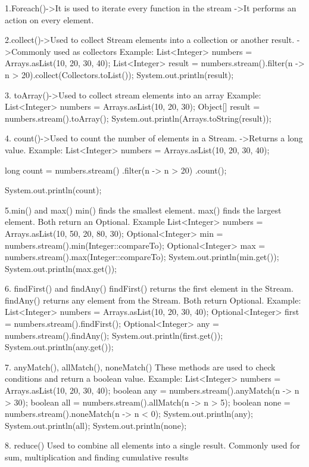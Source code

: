 {{{{{{{{1.Foreach()->It is used to iterate every function in the stream
			->It performs an action on every element.
			
			
2.collect()->Used to collect Stream elements into a collection or another result.
			->Commonly used as collectors
	Example:
			List<Integer> numbers = Arrays.asList(10, 20, 30, 40);
			List<Integer> result = numbers.stream().filter(n -> n > 20).collect(Collectors.toList());
			System.out.println(result);
			
3. toArray()->Used to collect stream elements into an array
Example:
List<Integer> numbers = Arrays.asList(10, 20, 30);
Object[] result = numbers.stream().toArray();
System.out.println(Arrays.toString(result));


4. count()->Used to count the number of elements in a Stream.
		  ->Returns a long value.
	Example:
	List<Integer> numbers = Arrays.asList(10, 20, 30, 40);


long count = numbers.stream()
                    .filter(n -> n > 20)
                    .count();


System.out.println(count);


5.min() and max()
min() finds the smallest element.
max() finds the largest element.
Both return an Optional.
Example
	List<Integer> numbers = Arrays.asList(10, 50, 20, 80, 30);
	Optional<Integer> min = numbers.stream().min(Integer::compareTo);
	Optional<Integer> max = numbers.stream().max(Integer::compareTo);
	System.out.println(min.get());
	System.out.println(max.get());


6. findFirst() and findAny()
findFirst() returns the first element in the Stream.
findAny() returns any element from the Stream.
Both return Optional.
Example:
	List<Integer> numbers = Arrays.asList(10, 20, 30, 40);
	Optional<Integer> first = numbers.stream().findFirst();
	Optional<Integer> any = numbers.stream().findAny();
	System.out.println(first.get());
	System.out.println(any.get());


7. anyMatch(), allMatch(), noneMatch()
These methods are used to check conditions and return a boolean value.
Example:
	List<Integer> numbers = Arrays.asList(10, 20, 30, 40);
	boolean any = numbers.stream().anyMatch(n -> n > 30);
	boolean all = numbers.stream().allMatch(n -> n > 5);
	boolean none = numbers.stream().noneMatch(n -> n < 0);
	System.out.println(any);
	System.out.println(all);
	System.out.println(none);
	
8. reduce()
		Used to combine all elements into a single result.
		Commonly used for sum, multiplication and finding cumulative results
		
}}}}}}}}
